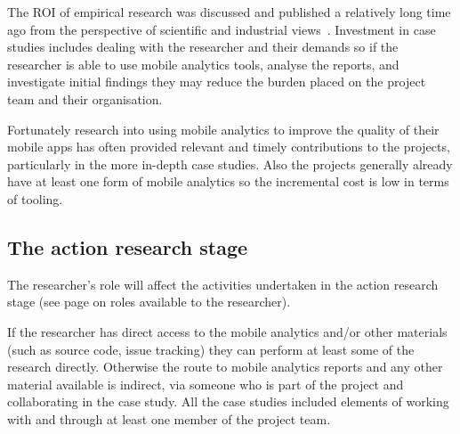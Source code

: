 The ROI of empirical research was discussed and published a relatively long time ago from the perspective of scientific and industrial views~\citet[pp54-57]{prechelt_2007_optimizing_ROI_for_empirical_SE_studies}. Investment in case studies includes dealing with the researcher and their demands so if the researcher is able to use mobile analytics tools, analyse the reports, and investigate initial findings they may reduce the burden placed on the project team and their organisation.

Fortunately research into using mobile analytics to improve the quality of their mobile apps has often provided relevant and timely contributions to the projects, particularly in the more in-depth case studies. Also the projects generally already have at least one form of mobile analytics so the incremental cost is low in terms of tooling.
 
\subsection{The action research stage}

The researcher's role will affect the activities undertaken in the action research stage (see page \pageref{section-evaluation-through-action-research-method} on roles available to the researcher).

If the researcher has direct access to the mobile analytics and/or other materials (such as source code, issue tracking) they can perform at least some of the research directly. Otherwise the route to mobile analytics reports and any other material available is indirect, via someone who is part of the project and collaborating in the case study. All the case studies included elements of working with and through at least one member of the project team.

